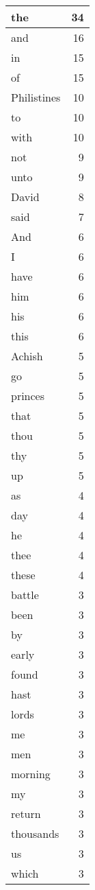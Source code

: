 \begin{center}
\begin{longtable}{l|r}
\hline \hline
\endlastfoot
the & 34 \\ \hline
and & 16 \\ \hline
in & 15 \\ \hline
of & 15 \\ \hline
Philistines & 10 \\ \hline
to & 10 \\ \hline
with & 10 \\ \hline
not & 9 \\ \hline
unto & 9 \\ \hline
David & 8 \\ \hline
said & 7 \\ \hline
And & 6 \\ \hline
I & 6 \\ \hline
have & 6 \\ \hline
him & 6 \\ \hline
his & 6 \\ \hline
this & 6 \\ \hline
Achish & 5 \\ \hline
go & 5 \\ \hline
princes & 5 \\ \hline
that & 5 \\ \hline
thou & 5 \\ \hline
thy & 5 \\ \hline
up & 5 \\ \hline
as & 4 \\ \hline
day & 4 \\ \hline
he & 4 \\ \hline
thee & 4 \\ \hline
these & 4 \\ \hline
battle & 3 \\ \hline
been & 3 \\ \hline
by & 3 \\ \hline
early & 3 \\ \hline
found & 3 \\ \hline
hast & 3 \\ \hline
lords & 3 \\ \hline
me & 3 \\ \hline
men & 3 \\ \hline
morning & 3 \\ \hline
my & 3 \\ \hline
return & 3 \\ \hline
thousands & 3 \\ \hline
us & 3 \\ \hline
which & 3 \\ \hline

\end{longtable}
\end{center}
